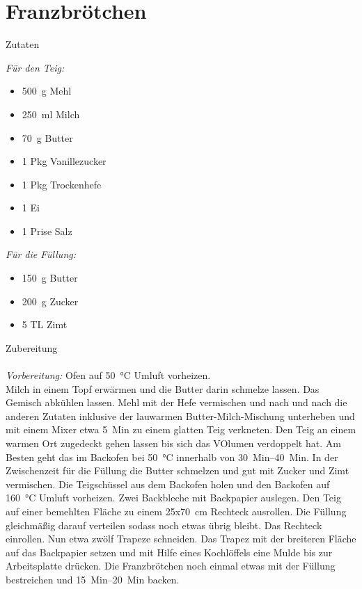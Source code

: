 \section*{Franzbrötchen}
\ihead{}\ohead{}
\cfoot{}
{\Large Zutaten}
\begin{multicols}{2}
\textit{Für den Teig:}
\begin{itemize}
    \item \SI{500}{g} Mehl
    \item \SI{250}{ml} Milch
    \item \SI{70}{g} Butter
    \item \num{1} Pkg Vanillezucker
    \item \num{1} Pkg Trockenhefe
    \item \num{1} Ei
    \item \num{1} Prise Salz
\end{itemize}
\textit{Für die Füllung:}
\begin{itemize}
    \item \SI{150}{g} Butter
    \item \SI{200}{g} Zucker
    \item \num{5} TL Zimt
\end{itemize}
\end{multicols}
\noindent
{\Large Zubereitung}\\
\\
\textit{Vorbereitung:} Ofen auf \SI{50}{\celsius} Umluft vorheizen.\\
Milch in einem Topf erwärmen und die Butter darin schmelze lassen.
Das Gemisch abkühlen lassen. 
Mehl mit der Hefe vermischen und nach und nach die anderen Zutaten inklusive der lauwarmen Butter-Milch-Mischung unterheben und mit einem Mixer etwa \SI{5}{Min} zu einem glatten Teig verkneten.
Den Teig an einem warmen Ort zugedeckt gehen lassen bis sich das VOlumen verdoppelt hat. 
Am Besten geht das im Backofen bei \SI{50}{\celsius} innerhalb von \SIrange{30}{40}{Min}. 
In der Zwischenzeit für die Füllung die Butter schmelzen und gut mit Zucker und Zimt vermischen. 
Die Teigschüssel aus dem Backofen holen und den Backofen auf \SI{160}{\celsius} Umluft vorheizen.
Zwei Backbleche mit Backpapier auslegen. 
Den Teig auf einer bemehlten Fläche zu einem \num{25}x\SI{70}{cm} Rechteck ausrollen. 
Die Füllung gleichmäßig darauf verteilen sodass noch etwas übrig bleibt. 
Das Rechteck einrollen.
Nun etwa zwölf Trapeze schneiden. 
Das Trapez mit der breiteren Fläche auf das Backpapier setzen und mit Hilfe eines Kochlöffels eine Mulde bis zur Arbeitsplatte drücken.
Die Franzbrötchen noch einmal etwas mit der Füllung bestreichen und \SIrange{15}{20}{Min} backen. 
